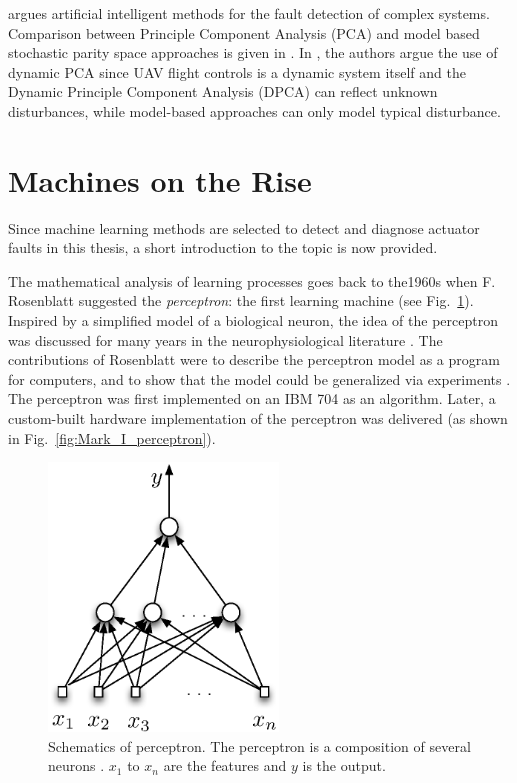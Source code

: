 \cite{gui2002fault} argues artificial intelligent methods for the fault detection of complex 
systems. Comparison between Principle Component Analysis (PCA) and model based stochastic parity space 
approaches is given in \cite{hagenblad2004comparison}.
In \cite{li2016data}, the authors argue the use of dynamic PCA since UAV flight 
controls is a dynamic system itself and the Dynamic Principle Component Analysis (DPCA) can reflect unknown disturbances, 
while model-based approaches can only model typical disturbance.  

\section{Machines on the Rise}

Since machine learning methods are selected to detect and diagnose actuator faults in this thesis, a short introduction to the topic is now provided. 

The mathematical analysis of learning processes goes back to the1960s when F. Rosenblatt \cite{rosenblatt1958perceptron} suggested the \emph{perceptron}: the first learning machine \cite{vapnik2013nature} (see Fig.~\ref{fig:perceptron}). 
Inspired by a simplified model of a biological neuron, the idea of the perceptron was discussed for many years in the neurophysiological literature \cite{vapnik2013nature}. The contributions of Rosenblatt were to describe the perceptron model as a program for computers, and to show that the model could be generalized via experiments \cite{vapnik2013nature}.
The perceptron was first implemented on an IBM 704 as an algorithm. 
Later, a custom-built hardware implementation of the perceptron was delivered (as shown in Fig.~\ref{fig:Mark_I_perceptron}).

\begin{figure}
\begin{center}
\includegraphics[width=6.1cm]{figures/perceptron}
\caption{Schematics of perceptron. The perceptron is a composition of several neurons \cite{vapnik2013nature}. $x_1$ to $x_n$ are the features and $y$ is the output.} 
\label{fig:perceptron}
\end{center}
\end{figure}


